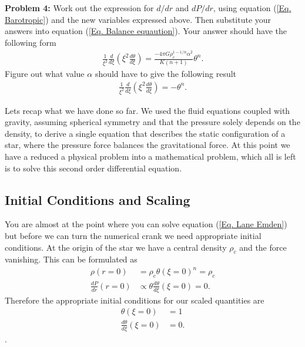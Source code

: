 \documentclass{article}
\begin{document}
\bigskip
\noindent
\textbf{Problem 4:} Work out the expression for $d/dr$ and $dP/dr$, using equation (\ref{Eq. Barotropic}) and the new variables expressed above. Then substitute your answers into equation (\ref{Eq. Balance equaution}). Your answer should have the following form
\begin{align*}
\frac{1}{\xi^2}\frac{d}{d\xi}\left(\xi^2\frac{d\theta}{d\xi}\right) = \frac{-4\pi G \rho_c^{1-1/n} \alpha^2}{K(n+1)} \theta^n.
\end{align*}
Figure out what value $\alpha$ should have to give the following result
\begin{align}
\label{Eq. Lane Emden}
\boxed{\frac{1}{\xi^2}\frac{d}{d\xi}\left(\xi^2\frac{d\theta}{d\xi}\right) = - \theta^n.}
\end{align}

Lets recap what we have done so far. We used the fluid equations coupled with gravity, assuming spherical symmetry and that the pressure solely depends on the density, to derive a single equation that describes the static configuration of a star, where the pressure force balances the gravitational force. At this point we have a reduced a physical problem into a mathematical problem, which all is left is to solve this second order differential equation. 

\subsection{Initial Conditions and Scaling}
You are almost at the point where you can solve equation (\ref{Eq. Lane Emden}) but before we can turn the numerical crank we need appropriate initial conditions. At the origin of the star we have a central density $\rho_c$ and the force vanishing. This can be formulated as
\begin{align*}
\rho(r=0) &=\rho_c\theta(\xi=0)^n = \rho_c\\
\frac{dP}{dr}(r=0) & \propto \theta\frac{d\theta}{d\xi}(\xi=0) = 0.
\end{align*}
Therefore the appropriate initial conditions for our scaled quantities are
\begin{align}
\label{Eq. Initial Conditions 1}
\theta(\xi=0) &= 1\\
\label{Eq. Initial Conditions 2}
\frac{d\theta}{d\xi}(\xi=0) &=0.
\end{align}.
\end{document}
